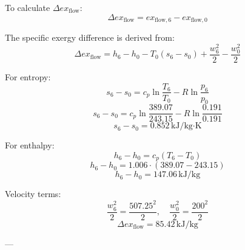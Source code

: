 To calculate \( \Delta ex_{\text{flow}} \):  
\[
\Delta ex_{\text{flow}} = ex_{\text{flow},6} - ex_{\text{flow},0}
\]  

The specific exergy difference is derived from:  
\[
\Delta ex_{\text{flow}} = h_6 - h_0 - T_0 \left( s_6 - s_0 \right) + \frac{w_6^2}{2} - \frac{w_0^2}{2}
\]  

For entropy:  
\[
s_6 - s_0 = c_p \ln \frac{T_6}{T_0} - R \ln \frac{p_6}{p_0}
\]  
\[
s_6 - s_0 = c_p \ln \frac{389.07}{243.15} - R \ln \frac{0.191}{0.191}
\]  
\[
s_6 - s_0 = 0.852 \, \text{kJ}/\text{kg·K}
\]  

For enthalpy:  
\[
h_6 - h_0 = c_p \left( T_6 - T_0 \right)
\]  
\[
h_6 - h_0 = 1.006 \cdot \left( 389.07 - 243.15 \right)
\]  
\[
h_6 - h_0 = 147.06 \, \text{kJ}/\text{kg}
\]  

Velocity terms:  
\[
\frac{w_6^2}{2} = \frac{507.25^2}{2}, \quad \frac{w_0^2}{2} = \frac{200^2}{2}
\]  
\[
\Delta ex_{\text{flow}} = 85.42 \, \text{kJ}/\text{kg}
\]

---